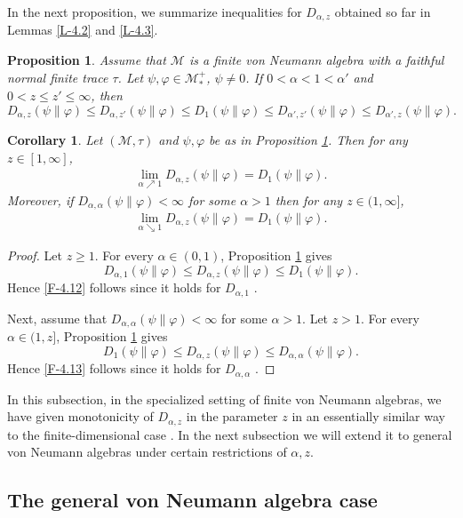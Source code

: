 \documentclass[12pt]{article}
\newtheorem{coro}[theorem]{Corollary}
\newtheorem{prop}[theorem]{Proposition}
\theoremstyle{definition}
\theoremstyle{remark}
\numberwithin{equation}{section}
\def\Me{\mathcal M}
\def\ffi{\varphi}
\begin{document}
In the next proposition, we summarize inequalities for $D_{\alpha,z}$ obtained so far in Lemmas \ref{L-4.2}
and \ref{L-4.3}.

\begin{prop}\label{P-4.4}
Assume that $\Me$ is a finite von Neumann algebra with a faithful normal finite trace $\tau$. Let
$\psi,\ffi\in\Me_*^+$, $\psi\ne0$. If $0<\alpha<1<\alpha'$ and $0<z\le z'\le\infty$, then
\[
D_{\alpha,z}(\psi\|\ffi)\le D_{\alpha,z'}(\psi\|\ffi)\le D_1(\psi\|\ffi)
\le D_{\alpha',z'}(\psi\|\ffi)\le D_{\alpha',z}(\psi\|\ffi).
\]
\end{prop}

\begin{coro}\label{C-4.5}
Let $(\Me,\tau)$ and $\psi,\ffi$ be as in Proposition \ref{P-4.4}. Then for any $z\in[1,\infty]$,
\begin{align}\label{F-4.12}
\lim_{\alpha\nearrow1}D_{\alpha,z}(\psi\|\ffi)=D_1(\psi\|\ffi).
\end{align}
Moreover, if $D_{\alpha,\alpha}(\psi\|\ffi)<\infty$ for some $\alpha>1$ then for any $z\in(1,\infty]$,
\begin{align}\label{F-4.13}
\lim_{\alpha\searrow1}D_{\alpha,z}(\psi\|\ffi)=D_1(\psi\|\ffi).
\end{align}
\end{coro}

\begin{proof}
Let $z\ge1$. For every $\alpha\in(0,1)$, Proposition \ref{P-4.4} gives
\[
D_{\alpha,1}(\psi\|\ffi)\le D_{\alpha,z}(\psi\|\ffi)\le D_1(\psi\|\ffi).
\]
Hence \eqref{F-4.12} follows since it holds for $D_{\alpha,1}$ \cite[Proposition 5.3(3)]{hiai2018quantum}.

Next, assume that $D_{\alpha,\alpha}(\psi\|\ffi)<\infty$ for some $\alpha>1$. Let $z>1$. For every
$\alpha\in(1,z]$, Proposition \ref{P-4.4} gives
\[
D_1(\psi\|\ffi)\le D_{\alpha,z}(\psi\|\ffi)\le D_{\alpha,\alpha}(\psi\|\ffi).
\]
Hence \eqref{F-4.13} follows since it holds for $D_{\alpha,\alpha}$ \cite[Proposition 3.8(ii)]{jencova2018renyi}.
\end{proof}

\medskip
In this subsection, in the specialized setting of finite von Neumann algebras, we have given monotonicity
of $D_{\alpha,z}$ in the parameter $z$ in an essentially similar way to the finite-dimensional case
\cite{mosonyi2023somecontinuity}. In the next subsection we will extend it to general von Neumann algebras
under certain restrictions of $\alpha,z$.

\subsection{The general von Neumann algebra case}
\end{document}
